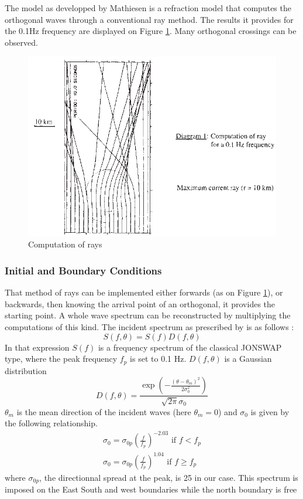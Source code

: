 The model as developped by Mathiesen is a refraction model that computes the
orthogonal waves through a conventional ray method. The results it provides for
the 0.1Hz frequency are displayed on Figure \ref{ray}. Many orthogonal
crossings can be observed.
\begin{figure} [!h]
\centering
\includegraphics[scale = 0.5]{diagram.png}
 \caption{Computation of rays}
\label{ray}
\end{figure}

\subsubsection{Initial and Boundary Conditions}

That method of rays can be implemented  either forwards (as on Figure
\ref{ray}), or backwards, then knowing the arrival point of an orthogonal,  it
provides the starting point. A whole wave spectrum can be reconstructed by
multiplying the computations of this kind. The incident spectrum as prescribed
by \cite{mathiesen} is as follows :
$$
S(f,\theta)=S(f)D(f,\theta)
$$
In that expression $S(f)$ is a frequency spectrum of the classical JONSWAP
type, where the peak frequency $f_p$ is set to 0.1 Hz.
$D(f,\theta)$ is a Gaussian distribution
$$
D(f,\theta)=\frac{\exp(-\frac{(\theta-\theta_m)^2}{2\sigma_0^2} )}{\sqrt{2\pi}\sigma_0}
$$
$\theta_m$ is the mean direction of the incident waves (here $\theta_m=0$) and
$\sigma_0$ is given by the following relationship.
$$
\left.
\begin{array}{ll}
\sigma_0= \sigma_{0p}(\frac{f}{f_p})^{-2.03}\mbox{ if }f<f_p \\[6pt]
\sigma_0= \sigma_{0p}(\frac{f}{f_p})^{1.04}\mbox{ if } f \ge f_p
\end{array}
\right.
$$
where $\sigma_{0p}$, the directionnal spread at the peak, is 25 in our case.
This spectrum is imposed on the East South and west boundaries while the north boundary is free

